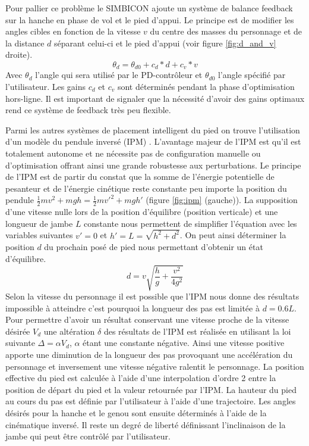 \documentclass[runningheads,a4paper]{llncs}
\begin{document}
Pour pallier ce problème le SIMBICON ajoute un système de balance feedback sur la hanche en phase de vol et le pied d'appui. Le principe est de modifier les angles cibles en fonction de la vitesse $v$ du centre des masses du personnage et de la distance \(d\) séparant celui-ci et le pied d'appui (voir figure \ref{fig:d_and_v} droite). 
\[
\theta_d=\theta_{d0} + c_d*d + c_v*v 
\]
Avec \(\theta_d\) l'angle qui sera utilisé par le PD-contrôleur et \(\theta_{d0}\) l'angle spécifié par l'utilisateur.
Les gains \(c_d\) et \(c_v\) sont déterminés pendant la phase d'optimisation hors-ligne. Il est important de signaler que la nécessité d'avoir des gains optimaux rend ce système de feedback très peu flexible.


Parmi les autres systèmes de placement intelligent du pied on trouve l'utilisation d'un modèle du pendule inversé (IPM) \cite{coros2010generalized,kajita20013d}. L'avantage majeur de l'IPM est qu'il est totalement autonome et ne nécessite pas de configuration manuelle ou d'optimisation offrant ainsi une grande robustesse aux perturbations. Le principe de l'IPM est de partir du constat que la somme de l'énergie potentielle de pesanteur et de l'énergie cinétique reste constante peu importe la position du pendule  $\frac{1}{2}mv^2+mgh=\frac{1}{2}mv'^2+mgh'$ (figure \ref{fig:ipm} (gauche)). La supposition d'une vitesse nulle lors de la position d'équilibre (position verticale) et une longueur de jambe $L$ constante nous permettent de simplifier l'équation avec les variables suivantes \(v'=0\) et \(h'=L=\sqrt{h^2+d^2}\). On peut ainsi déterminer la position \(d\) du prochain posé de pied nous permettant d'obtenir un état d'équilibre.
\[
d=v\sqrt{\frac{h}{g}+\frac{v^2}{4g^2}}
\]
Selon la vitesse du personnage il est possible que l'IPM nous donne des résultats impossible à atteindre c'est pourquoi la longueur des pas est limitée à \(d=0.6L\).
Pour permettre d'avoir un résultat conservant une vitesse proche de la vitesse désirée \(V_d\) une altération $\delta$ des résultats de l'IPM est réalisée en utilisant la loi suivante \(\Delta=\alpha V_d\), $\alpha$ étant une constante négative. Ainsi une vitesse positive apporte une diminution de la longueur des pas provoquant une accélération du personnage et inversement une vitesse négative ralentit le personnage.
La position effective du pied est calculée à l'aide d'une interpolation d'ordre 2 entre la position de départ du pied et la valeur retournée par l'IPM. La hauteur du pied au cours du pas est définie par l'utilisateur à l'aide d'une trajectoire. Les angles désirés pour la hanche et le genou sont ensuite déterminés à l'aide de la cinématique inversé. Il reste un degré de liberté définissant l'inclinaison de la jambe qui peut être contrôlé par l'utilisateur.
\end{document}

